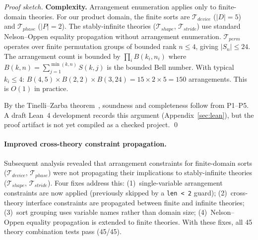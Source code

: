 \documentclass[11pt]{article}
\begin{document}
\begin{proof}[Proof sketch]
\noindent\textbf{Complexity.}
Arrangement enumeration applies only to finite-domain theories.
For our product domain, the finite sorts are
$\mathcal{T}_{\mathit{device}}$ ($|D| = 5$) and $\mathcal{T}_{\mathit{phase}}$ ($|P| = 2$).
The stably-infinite theories ($\mathcal{T}_{\mathit{shape}}$, $\mathcal{T}_{\mathit{stride}}$)
use standard Nelson--Oppen equality propagation without arrangement enumeration.
$\mathcal{T}_{\mathit{perm}}$ operates over finite permutation groups of bounded rank
$n \leq 4$, giving $|S_n| \leq 24$.
The arrangement count is bounded by
$\prod_i B(k_i, n_i)$ where $B(k, n) = \sum_{j=1}^{\min(k,n)} S(k, j)$
is the bounded Bell number.
With typical $k_i \leq 4$:
$B(4,5) \times B(2,2) \times B(3,24) = 15 \times 2 \times 5 = 150$ arrangements.
This is $O(1)$ in practice.

By the Tinelli--Zarba theorem~\cite{tinelli03}, soundness and completeness
follow from P1--P5. A draft Lean~4 development records this argument
(Appendix~\ref{sec:lean}), but the proof artifact is not yet compiled as
a checked project. \qed
\end{proof}

\paragraph{Improved cross-theory constraint propagation.}
Subsequent analysis revealed that arrangement constraints for
finite-domain sorts ($\mathcal{T}_{\mathit{device}}$,
$\mathcal{T}_{\mathit{phase}}$) were not propagating their
implications to stably-infinite theories
($\mathcal{T}_{\mathit{shape}}$, $\mathcal{T}_{\mathit{stride}}$).
Four fixes address this:
(1)~single-variable arrangement constraints are now applied
(previously skipped by a \texttt{len < 2} guard);
(2)~cross-theory interface constraints are propagated between
finite and infinite theories;
(3)~sort grouping uses variable names rather than domain size;
(4)~Nelson--Oppen equality propagation is extended to finite theories.
With these fixes, all 45 theory combination tests pass (45/45).
\end{document}
